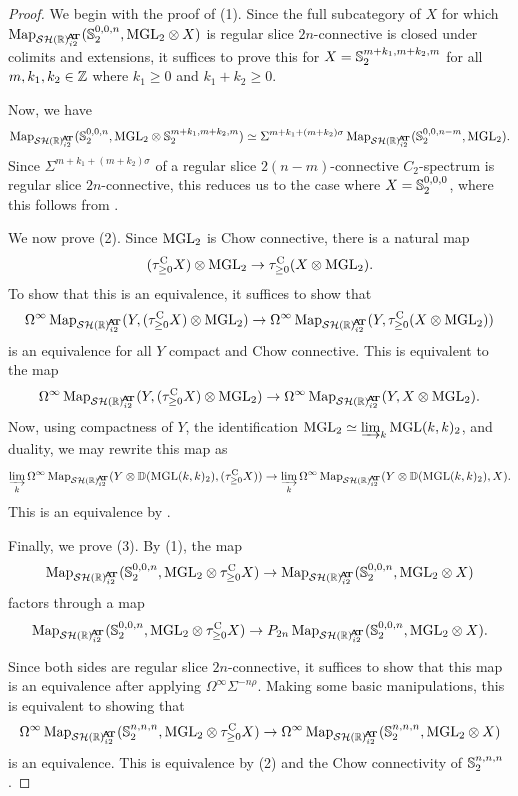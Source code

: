 \begin{proof}
  We begin with the proof of (1).
  Since the full subcategory of $X$ for which $\Map_{\SHRat} (\Ss_2^{0,0,n}, \MGL_2 \otimes X)$ is regular slice $2n$-connective is closed under colimits and extensions, it suffices to prove this for $X = \operatorname{\mathbb{S}}_2^{m+k_1,m+k_2,m}$ for all $m,k_1,k_2 \in \mathbb{Z}$ where $k_1 \geq 0$ and $k_1 + k_2 \geq 0$.

%
  Now, we have
  \[\Map_{\SHRat} (\Ss_2^{0,0,n}, \MGL_2 \otimes \Ss_2^{m+k_1,m+k_2,m}) \simeq \Sigma^{m+k_1+(m+k_2)\sigma} \Map_{\SHRat} (\Ss_2^{0,0,n-m}, \MGL_2).\]
  Since $\Sigma^{m+k_1+(m+k_2)\sigma}$ of a regular slice $2(n-m)$-connective $C_2$-spectrum is regular slice $2n$-connective, this reduces us to the case where $X = \operatorname{\mathbb{S}}_2^{0,0,0}$, where this follows from .

  We now prove (2).
  Since $\mathrm{MGL}_2$ is Chow connective, there is a natural map 
  \[(\tau_{\geq 0} ^{\mathrm{C}} X) \otimes \mathrm{MGL}_2 \to \tau_{\geq 0} ^{\mathrm{C}} (X \otimes \mathrm{MGL}_2).\]
  To show that this is an equivalence, it suffices to show that
  \[\Omega^{\infty} \Map_{\SHRat} (Y, (\tau_{\geq 0} ^{\cn} X) \otimes \MGL_2) \to \Omega^{\infty} \Map_{\SHRat} (Y, \tau_{\geq 0} ^{\cn} (X \otimes \MGL_2))\]
  is an equivalence for all $Y$ compact and Chow connective.
  This is equivalent to the map
  \[\Omega^{\infty} \Map_{\SHRat} (Y, (\tau_{\geq 0} ^{\cn} X) \otimes \MGL_2) \to \Omega^{\infty} \Map_{\SHRat} (Y, X \otimes \MGL_2).\]
  Now, using compactness of $Y$, the identification $\mathrm{MGL}_2 \simeq \varinjlim_{k} \mathrm{MGL}(k,k)_2$, and duality, we may rewrite this map as
  \[\varinjlim_k \Omega^{\infty} \Map_{\SHRat} (Y \otimes \mathbb{D} (\MGL(k,k)_2), (\tau_{\geq 0} ^{\cn} X)) \to \varinjlim_k \Omega^{\infty} \Map_{\SHRat} (Y \otimes \mathbb{D} (\MGL(k,k)_2), X).\]
  This is an equivalence by .

  Finally, we prove (3).
  By (1), the map
  \[\Map_{\SHRat} (\Ss_2^{0,0,n}, \MGL_2 \otimes \tau_{\geq 0} ^{\cn} X) \to \Map_{\SHRat} (\Ss_2^{0,0,n}, \MGL_2 \otimes X)\]
  factors through a map
  \[\Map_{\SHRat} (\Ss_2^{0,0,n}, \MGL_2 \otimes \tau_{\geq 0} ^{\cn} X) \to P_{2n} \Map_{\SHRat} (\Ss_2^{0,0,n}, \MGL_2 \otimes X).\]

  Since both sides are regular slice $2n$-connective, it suffices to show that this map is an equivalence after applying $\Omega^{\infty} \Sigma^{-n\rho}$. Making some basic manipulations, this is equivalent to showing that
  \[\Omega^{\infty} \Map_{\SHRat} (\Ss_2^{n,n,n}, \MGL_2 \otimes \tau_{\geq 0} ^{\cn} X) \to \Omega^{\infty} \Map_{\SHRat} (\Ss_2^{n,n,n}, \MGL_2 \otimes X)\]
  is an equivalence.
  This is equivalence by (2) and the Chow connectivity of $\operatorname{\mathbb{S}}_2^{n,n,n}$.
\end{proof}
